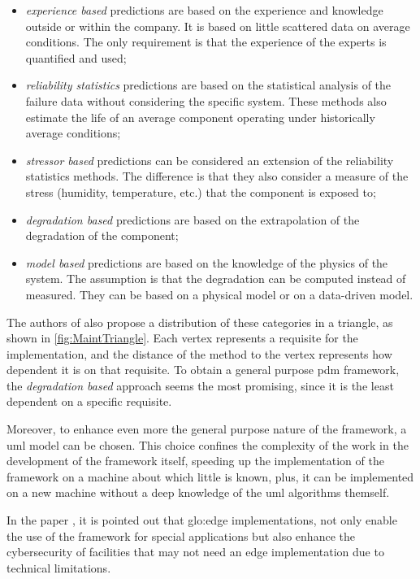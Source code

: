 \begin{itemize}
    \item \emph{experience based} predictions are based on the experience and knowledge outside or within the company. It is based on little scattered data on average conditions. The only  requirement is that the experience of the experts is quantified and used;
    \item \emph{reliability statistics} predictions are based on the statistical analysis of the failure data without considering the specific system. These methods also estimate the life
    of an average component operating under historically average conditions;
    \item \emph{stressor based} predictions can be considered an extension of the reliability statistics methods. The difference is that they also consider a measure of the stress (humidity, temperature, etc.) that the component is exposed to;
    \item \emph{degradation based} predictions are based on the extrapolation of the degradation of the component;
    \item \emph{model based} predictions are based on the knowledge of the physics of the system. The assumption is that the degradation can be computed instead of measured. They can be based on a physical model or on a data-driven model.
\end{itemize}


The authors of \cite{Maintenance_cat} also propose a distribution of these categories in a triangle, as shown in \autoref{fig:MaintTriangle}. Each vertex represents a requisite for the implementation, and the distance of the method to the vertex represents how dependent it is on that requisite. To obtain a general purpose \gls{pdm} framework, the \emph{degradation based} approach seems the most promising, since it is the least dependent on a specific requisite.

Moreover, to enhance even more the general purpose nature of the framework, a \gls{uml} model can be chosen. This choice confines the complexity of the work in the development of the framework itself, speeding up the implementation of the framework on a machine about which little is known, plus, it can be implemented on a new machine without a deep knowledge of the \gls{uml} algorithms themself.

In the paper \cite{GridPredictMaintenance}, it is pointed out that \gls{glo:edge} implementations, not only enable the use of the framework for special applications but also enhance the cybersecurity of facilities that may not need an edge implementation due to technical limitations.